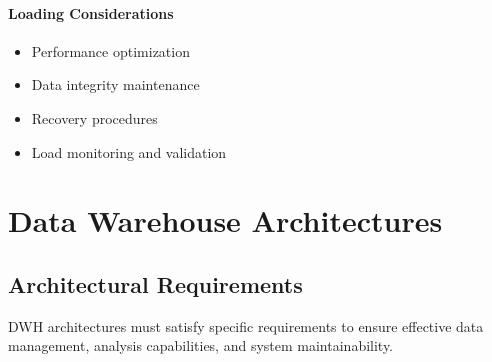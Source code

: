 \documentclass[a4paper,11pt]{article}
\newcommand{\definition}[1]{
  \begin{tcolorbox}[colback=blue!5,colframe=blue!40!black,title=Definition]
    #1
  \end{tcolorbox}
}
\begin{document}
\paragraph{Loading Considerations}
\begin{itemize}
    \item Performance optimization
    \item Data integrity maintenance
    \item Recovery procedures
    \item Load monitoring and validation
\end{itemize}
\section{Data Warehouse Architectures}

\subsection{Architectural Requirements}
\definition{
DWH architectures must satisfy specific requirements to ensure effective data management, analysis capabilities, and system maintainability.
}
\end{document}
